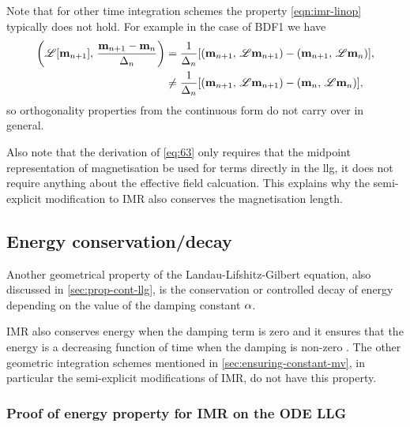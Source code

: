 Note that for other time integration schemes the property \cref{eqn:imr-linop} typically does not hold.
For example in the case of BDF1 we have
\begin{equation}
  \begin{aligned}
    \left(\mathscr{L} {\left[ \mathbf{m}_{n+1} \right]},\,  \frac{\mathbf{m}_{n+1} - \mathbf{m}_n}{\Delta_{n}}  \right)
    &= \frac{1}{\Delta_{n}} {\left[  \left(\mathbf{m}_{n+1},\, \mathscr{L} \mathbf{m}_{n+1} \right) 
      - \left(\mathbf{m}_{n+1},\, \mathscr{L} \mathbf{m}_n \right)  \right]}, \\
    &\neq \frac{1}{\Delta_{n}} {\left[  \left(\mathbf{m}_{n+1},\, \mathscr{L} \mathbf{m}_{n+1} \right)
      - \left(\mathbf{m}_n,\, \mathscr{L} \mathbf{m}_n \right)  \right]},
  \end{aligned}
\end{equation}
so orthogonality properties from the continuous form do not carry over in general.

Also note that the derivation of \cref{eq:63} only requires that the midpoint representation of magnetisation be used for terms directly in the llg, it does not require anything about the effective field calcuation.
This explains why the semi-explicit modification to IMR also conserves the magnetisation length. 


\subsection{Energy conservation/decay}
\label{sec:energy-cons}

Another geometrical property of the Landau-Lifshitz-Gilbert equation, also discussed in \cref{sec:prop-cont-llg}, is the conservation or controlled decay of energy depending on the value of the damping constant $\alpha$.

IMR also conserves energy when the damping term is zero and it ensures that the energy is a decreasing function of time when the damping is non-zero \cite{DAquino2005}.
The other geometric integration schemes mentioned in \cref{sec:ensuring-constant-mv}, in particular the semi-explicit modifications of IMR, do not have this property.


\subsubsection{Proof of energy property for IMR on the ODE LLG}
\label{sec:proof-energy-prop}

